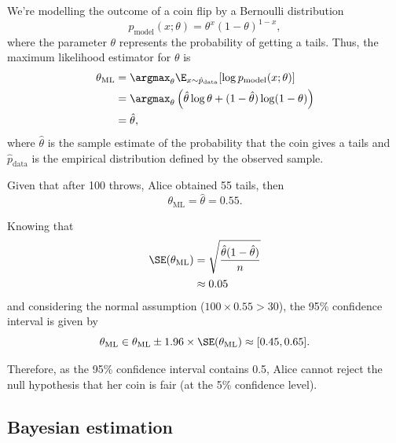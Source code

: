 \documentclass[12pt]{article}
\begin{document}
  We're modelling the outcome of a coin flip by a Bernoulli distribution 
  \begin{equation}
    p_{\text{model}}(x; \theta) = \theta^x {(1 - \theta)}^{1 - x},
  \end{equation} 
  where the parameter $\theta$ represents the probability of getting a tails.
  Thus, the maximum likelihood estimator for $\theta$ is
  \begin{equation}
    \begin{split}
      \theta_{\text{ML}} &= \argmax_\theta \E_{x \sim
        \hat{p}_{\text{data}}} [\log p_{\text{model}}(x; \theta)]\\
      &= \argmax_\theta \left(\hat{\theta} \log\theta + (1 -
        \hat{\theta}) \log(1 - \theta)\right)\\
      &= \hat{\theta},
    \end{split}
  \end{equation}
  where $\hat{\theta}$ is the sample estimate of the probability that the
  coin gives a tails and $\hat{p}_{\text{data}}$ is the empirical
  distribution defined by the observed sample.

  Given that after 100 throws, Alice obtained 55 tails, then
  \begin{equation}
    \theta_{\text{ML}} = \hat{\theta} = 0.55.
  \end{equation}

  Knowing that 
  \begin{equation}
    \begin{split}
      \SE(\theta_{\text{ML}}) &= \sqrt{\frac{\hat{\theta} (1 -
        \hat{\theta})}{n}}\\
      &\approx 0.05
    \end{split}
  \end{equation}
  and considering the normal assumption ($100 \times 0.55 > 30$), the 95\%
  confidence interval is given by
  \begin{equation}
    \theta_{\text{ML}} \in \theta_{\text{ML}} \pm 1.96\times
      \SE(\theta_{\text{ML}}) \approx [0.45, 0.65].
  \end{equation}

  Therefore, as the 95\% confidence interval contains 0.5, Alice cannot reject
  the null hypothesis that her coin is fair (at the 5\% confidence level).
  
  \subsection{Bayesian estimation}
\end{document}
